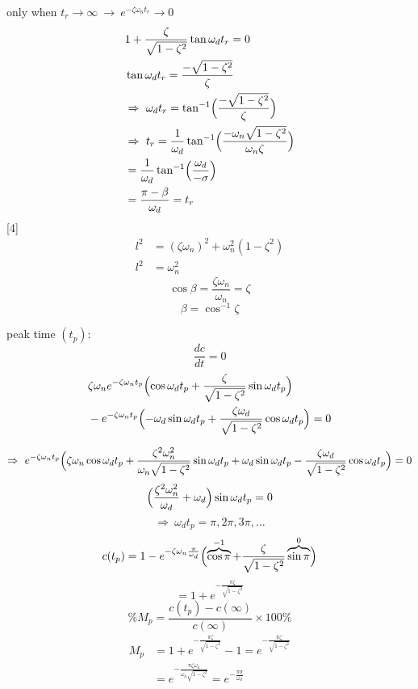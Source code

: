 \documentclass[11pt,a4paper]{article}
\begin{document}
only when $t_r\to\infty\ \to\ e^{-\zeta\omega_n t_r}\to 0$
\begin{align*}
&1+\frac{\zeta}{\sqrt{1-\zeta^2}}\tan\omega_d t_r=0\\
&\tan\omega_d t_r=\frac{-\sqrt{1-\zeta^2}}{\zeta}\\
&\Rightarrow\ \omega_d t_r=\tan^{-1}\Bigl(\frac{-\sqrt{1-\zeta^2}}{\zeta}\Bigr)\\
&\Rightarrow\ t_r=\frac{1}{\omega_d}\tan^{-1}\Bigl(\frac{-\omega_n\sqrt{1-\zeta^2}}{\omega_n\zeta}\Bigr)\\
&=\frac{1}{\omega_d}\tan^{-1}\Bigl(\frac{\omega_d}{-\sigma}\Bigr)\\
&=\frac{\pi-\beta}{\omega_d}=t_r
\end{align*}
[4]
\begin{align*}
l^2&=(\zeta\omega_n)^2+\omega_n^2(1-\zeta^2)\\
l^2&=\omega_n^2
\end{align*}
\[ \cos\beta=\frac{\zeta\omega_n}{\omega_n}=\zeta \]
\[ \beta=\cos^{-1}\zeta \]

peak time $(t_p)$:
\[ \frac{dc}{dt}=0 \]
\begin{align*}
&\zeta\omega_n e^{-\zeta\omega_n t_p}\Bigl(\cos\omega_d t_p+\frac{\zeta}{\sqrt{1-\zeta^2}}\sin\omega_d t_p\Bigr)\\
&-e^{-\zeta\omega_n t_p}\Bigl(-\omega_d\sin\omega_d t_p+\frac{\zeta\omega_d}{\sqrt{1-\zeta^2}}\cos\omega_d t_p\Bigr)=0
\end{align*}

\[ \Rightarrow\ e^{-\zeta\omega_n t_p}\Bigl(\zeta\omega_n\cos\omega_d t_p+\frac{\zeta^2\omega_n^2}{\omega_n\sqrt{1-\zeta^2}}\sin\omega_d t_p+\omega_d\sin\omega_d t_p-\frac{\zeta\omega_d}{\sqrt{1-\zeta^2}}\cos\omega_d t_p\Bigr)=0 \]
\[ \Bigl(\frac{\zeta^2\omega_n^2}{\omega_d}+\omega_d\Bigr)\sin\omega_d t_p=0 \]
\[ \Rightarrow\ \omega_d t_p=\pi,2\pi,3\pi,\ldots \]
\[ c(t_p)=1-e^{-\zeta\omega_n\frac{\pi}{\omega_d}}\Bigl(\overbrace{\cos\pi}^{-1}+\frac{\zeta}{\sqrt{1-\zeta^2}}\overbrace{\sin\pi}^{0}\Bigr) \]
\[ =1+e^{-\frac{\pi\zeta}{\sqrt{1-\zeta^2}}} \]
\[ \%M_p=\frac{c(t_p)-c(\infty)}{c(\infty)}\times 100\% \]
\begin{align*}
M_p&=1+e^{-\frac{\pi\zeta}{\sqrt{1-\zeta^2}}}-1=e^{-\frac{\pi\zeta}{\sqrt{1-\zeta^2}}}\\
&=e^{-\frac{\pi\zeta\omega_n}{\omega_n\sqrt{1-\zeta^2}}}=e^{-\frac{\pi\sigma}{\omega_d}}
\end{align*}
\end{document}
